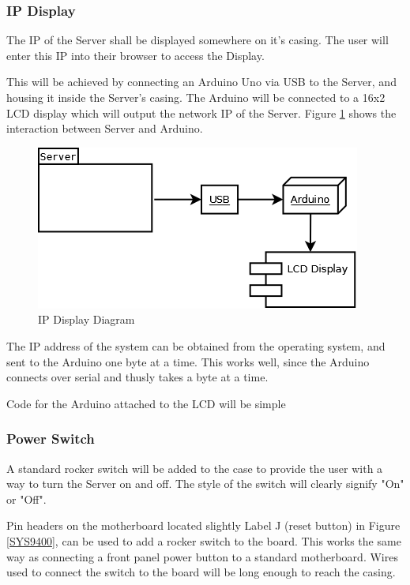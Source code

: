 \subsubsection{\ac{IP} Display}
The \ac{IP} of the Server shall be displayed somewhere on it's casing. 
The user will enter this \ac{IP} into their browser to access the Display.

This will be achieved by connecting an Arduino Uno via \ac{USB} to the Server, and housing it inside the Server's casing. 
The Arduino will be connected to a 16x2 \ac{LCD} display which will output the network \ac{IP} of the Server. 
Figure \ref{ArduinoLCD} shows the interaction between Server and Arduino.

\begin{figure}
\centering
\includegraphics[scale=0.5]{Hardware/images/ArduinoLCD.png}
\caption{\ac{IP} Display Diagram}
\label{ArduinoLCD}
\end{figure}

The \ac{IP} address of the system can be obtained from the operating system, and sent to the Arduino one byte at a time. 
This works well, since the Arduino connects over serial and thusly takes a byte at a time.

Code for the Arduino attached to the LCD will be simple


\subsubsection{Power Switch}
A standard rocker switch will be added to the case to provide the user with a way to turn the Server on and off. 
The style of the switch will clearly signify "On" or "Off".

Pin headers on the motherboard located slightly Label J (reset button) in Figure \ref{SYS9400}, can be used to add a rocker switch to the board.
This works the same way as connecting a front panel power button to a standard motherboard.
Wires used to connect the switch to the board will be long enough to reach the casing.


